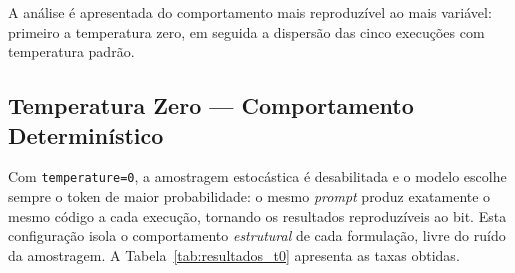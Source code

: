 \documentclass[12pt,
    english,
    french,
    spanish,
    brazil,
    ]{article}
\begin{document}
A análise é apresentada do comportamento mais reproduzível ao mais variável: primeiro a temperatura zero, em seguida a dispersão das cinco execuções com temperatura padrão.

\subsection{Temperatura Zero — Comportamento Determinístico}

Com \texttt{temperature=0}, a amostragem estocástica é desabilitada e o modelo escolhe sempre o token de maior probabilidade: o mesmo \textit{prompt} produz exatamente o mesmo código a cada execução, tornando os resultados reproduzíveis ao bit. Esta configuração isola o comportamento \textit{estrutural} de cada formulação, livre do ruído da amostragem. A Tabela~\ref{tab:resultados_t0} apresenta as taxas obtidas.

\begin{table}[H]
\centering
\caption{Taxas de aprovação — temperatura zero (determinístico)}
\label{tab:resultados_t0}
\end{table}
\end{document}
